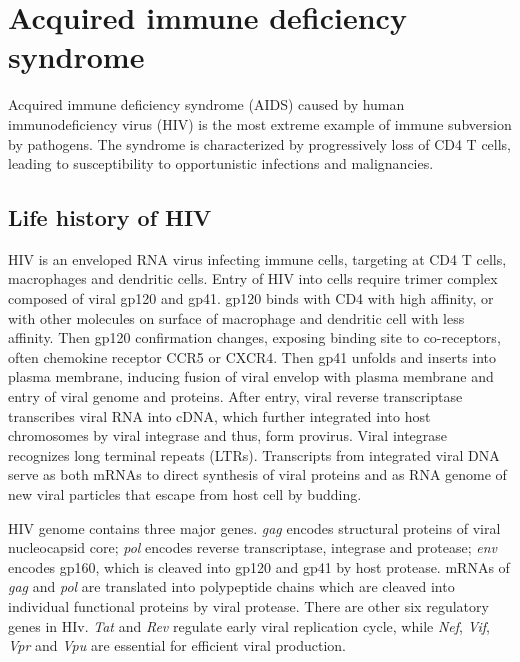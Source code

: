\documentclass[11pt]{article}
\begin{document}
\begin{sloppypar}
\section{Acquired immune deficiency syndrome}
Acquired immune deficiency syndrome (AIDS) caused by human immunodeficiency virus (HIV) is the most extreme example of immune subversion by pathogens. 
The syndrome is characterized by progressively loss of CD4 T cells, leading to susceptibility to opportunistic infections and malignancies. 

\subsection{Life history of HIV}
HIV is an enveloped RNA virus infecting immune cells, targeting at CD4 T cells, macrophages and dendritic cells. 
Entry of HIV into cells require trimer complex composed of viral gp120 and gp41. 
gp120 binds with CD4 with high affinity, or with other molecules on surface of macrophage and dendritic cell with less affinity. 
Then gp120 confirmation changes, exposing binding site to co-receptors, often chemokine receptor CCR5 or CXCR4. 
Then gp41 unfolds and inserts into plasma membrane, inducing fusion of viral envelop with plasma membrane and entry of viral genome and proteins. 
After entry, viral reverse transcriptase transcribes viral RNA into cDNA, which further integrated into host chromosomes by viral integrase and thus, form provirus. 
Viral integrase recognizes long terminal repeats (LTRs). 
Transcripts from integrated viral DNA serve as both mRNAs to direct synthesis of viral proteins and as RNA genome of new viral particles that escape from host cell by budding. 

\par

HIV genome contains three major genes. 
\textit{gag} encodes structural proteins of viral nucleocapsid core; 
\textit{pol} encodes reverse transcriptase, integrase and protease; 
\textit{env} encodes gp160, which is cleaved into gp120 and gp41 by host protease. 
mRNAs of \textit{gag} and \textit{pol} are translated into polypeptide chains which are cleaved into individual functional proteins by viral protease. 
There are other six regulatory genes in HIv. 
\textit{Tat} and \textit{Rev} regulate early viral replication cycle, while \textit{Nef}, \textit{Vif}, \textit{Vpr} and \textit{Vpu} are essential for efficient viral production. 

\par


\end{sloppypar}
\end{document}
